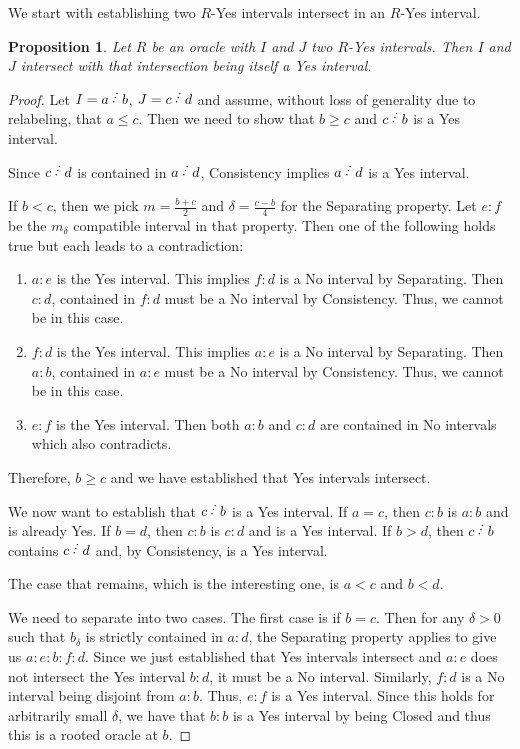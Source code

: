 \documentclass[12pt]{article}
\newtheorem{proposition}{Proposition}[subsection]
\begin{document}
We start with establishing two $R$-Yes intervals intersect in an $R$-Yes interval.

\begin{proposition}\label{pr:inter}
Let $R$ be an oracle with $I$ and $J$ two $R$-Yes intervals. Then $I$ and $J$ intersect with that intersection being itself a Yes interval. 
\end{proposition}


\begin{proof}
Let $I = a \lte b$, $J = c \lte d$ and assume, without loss of generality due to relabeling, that $ a\leq c$. Then we need to show that $b \geq c$ and $c \lte b$ is a Yes interval. 

Since $c \lte d$ is contained in $a \lte d$, Consistency implies $a \lte d$ is a Yes interval. 

If $b < c$, then we pick $m = \frac{b + c}{2}$ and $\delta = \frac{c-b}{4}$ for the Separating property. Let $e:f$ be the $m_\delta$ compatible interval in that property. Then one of the following holds true but each leads to a contradiction:
\begin{enumerate}
    \item $a:e$ is the Yes interval. This implies $f:d$ is a No interval by Separating. Then $c:d$, contained in $f:d$ must be a No interval by Consistency. Thus, we cannot be in this case. 
    \item $f:d$ is the Yes interval. This implies $a:e$ is a No interval by Separating. Then $a:b$, contained in $a:e$ must be a No interval by Consistency. Thus, we cannot be in this case. 
    \item $e:f$ is the Yes interval. Then both $a:b$ and $c:d$ are contained in No intervals which also contradicts. 
\end{enumerate}
Therefore, $b \geq c$ and we have established that Yes intervals intersect. 

We now want to establish that $c\lte b$ is a Yes interval. If $a=c$, then $c:b$ is $a:b$ and is already Yes. If $b=d$, then $c:b$ is $c:d$ and is a Yes interval. If $b > d$, then $c \lte b$ contains $c \lte d$ and, by Consistency, is a Yes interval. 

The case that remains, which is the interesting one, is $a < c$ and $ b < d$. 

We need to separate into two cases. The first case is if $b=c$. Then for any $\delta > 0$ such that $b_\delta$ is strictly contained in $a:d$, the Separating property applies to give us $a:e:b:f:d$. Since we just established that Yes intervals intersect and $a:e$ does not intersect the Yes interval $b:d$, it must be a No interval. Similarly, $f:d$ is a No interval being disjoint from $a:b$. Thus, $e:f$ is a Yes interval. Since this holds for arbitrarily small $\delta$, we have that $b:b$ is a Yes interval by being Closed and thus this is a rooted oracle at $b$. 


\end{proof}
\end{document}

